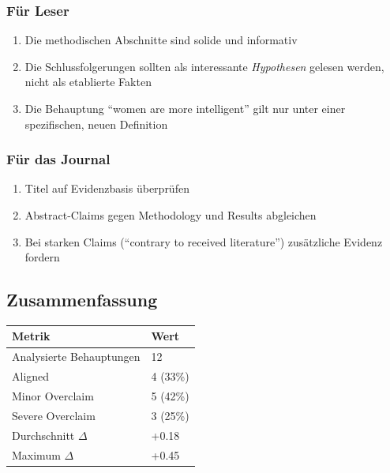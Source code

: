\subsubsection{F\"ur Leser}

\begin{enumerate}
    \item Die methodischen Abschnitte sind solide und informativ
    \item Die Schlussfolgerungen sollten als interessante \emph{Hypothesen} gelesen werden, nicht als etablierte Fakten
    \item Die Behauptung ``women are more intelligent'' gilt nur unter einer spezifischen, neuen Definition
\end{enumerate}

\subsubsection{F\"ur das Journal}

\begin{enumerate}
    \item Titel auf Evidenzbasis \"uberpr\"ufen
    \item Abstract-Claims gegen Methodology und Results abgleichen
    \item Bei starken Claims (``contrary to received literature'') zus\"atzliche Evidenz fordern
\end{enumerate}


\subsection{Zusammenfassung}

\begin{table}[H]
\centering
\begin{tabular}{ll}
\toprule
\textbf{Metrik} & \textbf{Wert} \\
\midrule
Analysierte Behauptungen & 12 \\
Aligned & 4 (33\%) \\
Minor Overclaim & 5 (42\%) \\
Severe Overclaim & 3 (25\%) \\
Durchschnitt $\Delta$ & +0.18 \\
Maximum $\Delta$ & +0.45 \\
\bottomrule
\end{tabular}
\end{table}

